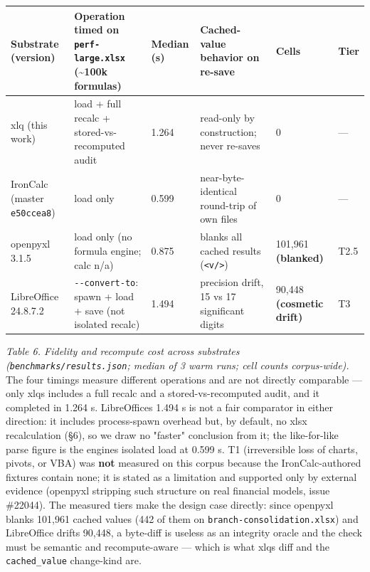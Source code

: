 \documentclass[
]{article}
\newcounter{none} %
\begin{document}
{\def\LTcaptype{none} %
\begin{longtable}[]{@{}llllll@{}}
\toprule\noalign{}
Substrate (version) & Operation timed on \texttt{perf-large.xlsx}
(\textasciitilde100k formulas) & Median (s) & Cached-value behavior on
re-save & Cells & Tier \\
\midrule\noalign{}
\endhead
\bottomrule\noalign{}
\endlastfoot
xlq (this work) & load + full recalc + stored-vs-recomputed audit &
1.264 & read-only by construction; never re-saves & 0 & --- \\
IronCalc (master \texttt{e50ccea8}) & load only & 0.599 &
near-byte-identical round-trip of own files & 0 & --- \\
openpyxl 3.1.5 & load only (no formula engine; calc n/a) & 0.875 &
blanks all cached results (\texttt{\textless{}v/\textgreater{}}) &
101,961 \textbf{(blanked)} & T2.5 \\
LibreOffice 24.8.7.2 & \texttt{-\/-convert-to}: spawn + load + save (not
isolated recalc) & 1.494 & precision drift, 15 vs 17 significant digits
& 90,448 \textbf{(cosmetic drift)} & T3 \\
\end{longtable}
}

\emph{Table 6. Fidelity and recompute cost across substrates
(\texttt{benchmarks/results.json}; median of 3 warm runs; cell counts
corpus-wide).} The four timings measure different operations and are not
directly comparable --- only xlq\textquotesingle s includes a full
recalc and a stored-vs-recomputed audit, and it completed in 1.264 s.
LibreOffice\textquotesingle s 1.494 s is not a fair comparator in either
direction: it includes process-spawn overhead but, by default, no xlsx
recalculation (§6), so we draw no "faster" conclusion from it; the
like-for-like parse figure is the engine\textquotesingle s isolated load
at 0.599 s. T1 (irreversible loss of charts, pivots, or VBA) was
\textbf{not} measured on this corpus because the IronCalc-authored
fixtures contain none; it is stated as a limitation and supported only
by external evidence (openpyxl stripping such structure on real
financial models, issue \#22044). The measured tiers make the design
case directly: since openpyxl blanks 101,961 cached values (442 of them
on \texttt{branch-consolidation.xlsx}) and LibreOffice drifts 90,448, a
byte-diff is useless as an integrity oracle and the check must be
semantic and recompute-aware --- which is what xlq\textquotesingle s
diff and the \texttt{cached\_value} change-kind are.
\end{document}
